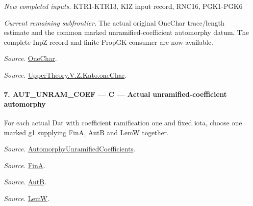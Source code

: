 \emph{New completed inputs.} KTR1-KTR13, KIZ input record, RNC16, PGK1-PGK6

\emph{Current remaining subfrontier.} The actual original OneChar trace/length estimate and the common marked unramified-coefficient automorphy datum. The complete InpZ record and finite PropGK consumer are now available.

\emph{Source.} \href{https://github.com/CocoSgt/riemann-hypothesis-lean/blob/7cbf7a0c32fca1badf05931879a37c3f8a2b03b4/src/Development/AutomorphicArithmetic/AutomorphicVarieties/UnitaryThreeGroups/KatoUse.lean#L54-L64}{OneChar}.

\emph{Source.} \href{https://github.com/CocoSgt/riemann-hypothesis-lean/blob/7cbf7a0c32fca1badf05931879a37c3f8a2b03b4/src/Development/AutomorphicArithmetic/AutomorphicVarieties/ModularityArgument/KatoQuadraticCharacters/OneChar.lean#L158-L178}{UpperTheory.V.Z.Kato.oneChar}.



\paragraph{7. AUT\_\allowbreak UNRAM\_\allowbreak COEF — C — Actual unramified-coefficient automorphy}

For each actual Dat with coefficient ramification one and fixed iota, choose one marked g1 supplying FinA, AutB and LemW together.

\emph{Source.} \href{https://github.com/CocoSgt/riemann-hypothesis-lean/blob/7cbf7a0c32fca1badf05931879a37c3f8a2b03b4/src/Development/AutomorphicArithmetic/AutomorphicVarieties/AutomorphicCases/AutomorphyUnramifiedCoefficients.lean#L24-L27}{AutomorphyUnramifiedCoefficients}.

\emph{Source.} \href{https://github.com/CocoSgt/riemann-hypothesis-lean/blob/7cbf7a0c32fca1badf05931879a37c3f8a2b03b4/src/Development/AutomorphicArithmetic/AutomorphicVarieties/AutomorphicCases/AutomorphyUnramifiedCoefficients.lean#L12-L13}{FinA}.

\emph{Source.} \href{https://github.com/CocoSgt/riemann-hypothesis-lean/blob/7cbf7a0c32fca1badf05931879a37c3f8a2b03b4/src/Development/AutomorphicArithmetic/AutomorphicVarieties/AutomorphicCases/AutomorphyUnramifiedCoefficients.lean#L15-L17}{AutB}.

\emph{Source.} \href{https://github.com/CocoSgt/riemann-hypothesis-lean/blob/7cbf7a0c32fca1badf05931879a37c3f8a2b03b4/src/Development/AutomorphicArithmetic/AutomorphicVarieties/AutomorphicCases/AutomorphyUnramifiedCoefficients.lean#L19-L22}{LemW}.




